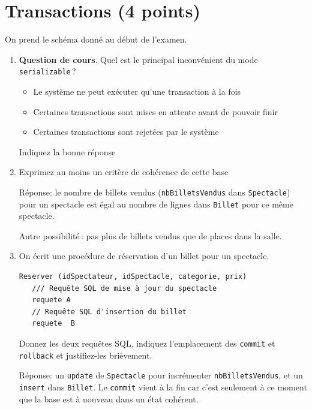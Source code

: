\section{Transactions (4 points)}

On prend le schéma donné au début de l'examen.
      
\begin{enumerate}

  \item \textbf{Question de cours}. Quel est le principal inconvénient du mode \texttt{serializable}\,?

  \begin{itemize}
    \item Le système ne peut exécuter qu’une transaction à la fois
    \item Certaines transactions sont mises en attente avant de pouvoir finir
    \item Certaines transactions sont rejetées par le système
\end{itemize}

   Indiquez la bonne réponse
   
\item Exprimez au moins un critère de cohérence de cette base 
 

\begin{solution}
Réponse: le nombre de billets vendus (\texttt{nbBilletsVendus} dans \texttt{Spectacle}) pour un spectacle est égal au nombre
de lignes dans \texttt{Billet} pour ce même spectacle.

Autre possibilité\,: pas plus de billets vendus que de places dans la salle.
\end{solution}

\item On écrit une procédure de réservation d'un billet pour un spectacle.

\begin{verbatim}
Reserver (idSpectateur, idSpectacle, categorie, prix)
   /// Requête SQL de mise à jour du spectacle
   requete A
   // Requête SQL d'insertion du billet
   requete  B
\end{verbatim}

Donnez les deux requêtes SQL, indiquez l'emplacement des \texttt{commit} et \texttt{rollback} 
et justifiez-les brièvement.

\begin{solution}
Réponse:  un \texttt{update} de \texttt{Spectacle} pour incrémenter \texttt{nbBilletsVendus},
et un \texttt{insert} dans \texttt{Billet}. Le \texttt{commit} vient à la fin car c'est seulement à ce moment
que la base est à nouveau dans un état cohérent. 
\end{solution}

\end{enumerate}


